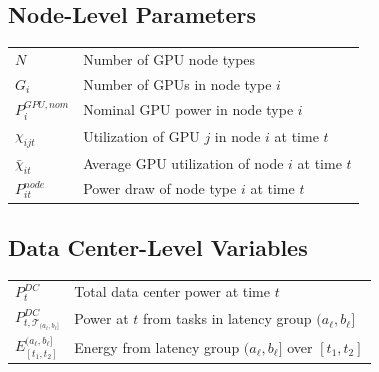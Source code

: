 \documentclass[preprint,12pt]{elsarticle}
\begin{document}
\subsection*{Node-Level Parameters}
\begin{tabular}{ll}
$N$ & Number of GPU node types \\
$G_i$ & Number of GPUs in node type $i$ \\
$P^{GPU,nom}_i$ & Nominal GPU power in node type $i$ \\
$\chi_{ijt}$ & Utilization of GPU $j$ in node $i$ at time $t$ \\
$\bar{\chi}_{it}$ & Average GPU utilization of node $i$ at time $t$ \\
$P^{node}_{it}$ & Power draw of node type $i$ at time $t$ \\
\end{tabular}

\vspace{1em}

\subsection*{Data Center-Level Variables}
\begin{tabular}{ll}
$P^{DC}_t$ & Total data center power at time $t$ \\
$P^{DC}_{t, \mathcal{T}_{(a_\ell, b_\ell]}}$ & Power at $t$ from tasks in latency group $(a_\ell, b_\ell]$ \\
$E^{(a_\ell, b_\ell]}_{[t_1, t_2]}$ & Energy from latency group $(a_\ell, b_\ell]$ over $[t_1, t_2]$ \\
\end{tabular}

\vspace{1em}
\end{document}
